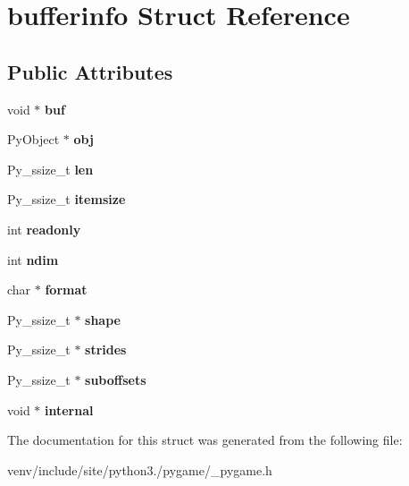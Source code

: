 \hypertarget{structbufferinfo}{}\section{bufferinfo Struct Reference}
\label{structbufferinfo}
\subsection*{Public Attributes}
\begin{DoxyCompactItemize}
\item 
\mbox{\label{structbufferinfo_aa1612327c7d07341a8e7977268414928}} 
void $\ast$ {\bfseries buf}
\item 
\mbox{\label{structbufferinfo_a0287133b4101fc4c9a99234d50f33d26}} 
Py\+Object $\ast$ {\bfseries obj}
\item 
\mbox{\label{structbufferinfo_af68796aac75561d6da012f5f1615981e}} 
Py\+\_\+ssize\+\_\+t {\bfseries len}
\item 
\mbox{\label{structbufferinfo_aa0de675754767fa69b18b75a579d9edc}} 
Py\+\_\+ssize\+\_\+t {\bfseries itemsize}
\item 
\mbox{\label{structbufferinfo_ac642ba143cd5883184a5000fde3c0273}} 
int {\bfseries readonly}
\item 
\mbox{\label{structbufferinfo_a6286d6ec73743f70b1025554fba51724}} 
int {\bfseries ndim}
\item 
\mbox{\label{structbufferinfo_abd230131599b8e4fbab14cc92bfb8751}} 
char $\ast$ {\bfseries format}
\item 
\mbox{\label{structbufferinfo_aef70e346a1de6bfcfcc18b601c55fb36}} 
Py\+\_\+ssize\+\_\+t $\ast$ {\bfseries shape}
\item 
\mbox{\label{structbufferinfo_a8c29b8c8440faab99793810b5ba12971}} 
Py\+\_\+ssize\+\_\+t $\ast$ {\bfseries strides}
\item 
\mbox{\label{structbufferinfo_a74e3c815c56f515aa353109f4284f0e6}} 
Py\+\_\+ssize\+\_\+t $\ast$ {\bfseries suboffsets}
\item 
\mbox{\label{structbufferinfo_ab238becb9fa7b6940afa059083e4d27e}} 
void $\ast$ {\bfseries internal}
\end{DoxyCompactItemize}


The documentation for this struct was generated from the following file\+:\begin{DoxyCompactItemize}
\item 
venv/include/site/python3./pygame/\+\_\+pygame.\+h\end{DoxyCompactItemize}
